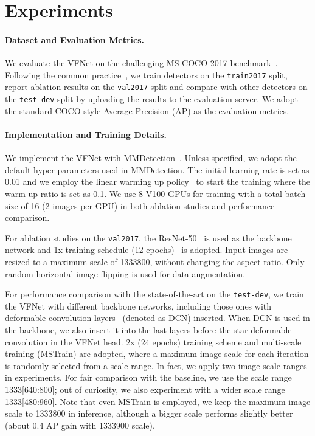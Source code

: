 \section{Experiments}
\paragraph{Dataset and Evaluation Metrics.}
We evaluate the VFNet on the challenging MS COCO 2017 benchmark~\cite{COCO}. Following the common practice~\cite{fasterRCNN, FCOS, retinaNet, ATSS}, we train detectors on the \texttt{train2017} split, report ablation results on the \texttt{val2017} split and compare with other detectors on the \texttt{test-dev} split by uploading the results to the evaluation server. We adopt the standard COCO-style Average Precision (AP) as the evaluation metrics. 

\vspace{-4mm}
\paragraph{Implementation and Training Details.} 
We implement the VFNet with MMDetection~\cite{mmdetection}. Unless specified, we adopt the default hyper-parameters used in MMDetection. The initial learning rate is set as 0.01 and we employ the linear warming up policy~\cite{1hour} to start the training where the warm-up ratio is set as 0.1. We use 8 V100 GPUs for training with a total batch size of 16 (2 images per GPU) in both ablation studies and performance comparison.

For ablation studies on the \texttt{val2017}, the ResNet-50~\cite{ResNet} is used as the backbone network and 1x training schedule (12 epochs)~\cite{mmdetection} is adopted. Input images are resized to a maximum scale of 1333800, without changing the aspect ratio. Only random horizontal image flipping is used for data augmentation. 

For performance comparison with the state-of-the-art on the \texttt{test-dev}, we train the VFNet with different backbone networks, including those ones with deformable convolution layers~\cite{DCN, DCNv2} (denoted as DCN) inserted. When DCN is used in the backbone, we also insert it into the last layers before the star deformable convolution in the VFNet head.  2x (24 epochs) training scheme and multi-scale training (MSTrain) are adopted, where a maximum image scale for each iteration is randomly selected from a scale range. In fact, we apply two image scale ranges in experiments. For fair comparison with the baseline, we use the scale range 1333[640:800]; out of curiosity, we also experiment with a wider scale range 1333[480:960]. Note that even MSTrain is employed, we keep the maximum image scale to 1333800 in inference, although a bigger scale performs slightly better (about 0.4 AP gain with 1333900 scale).

